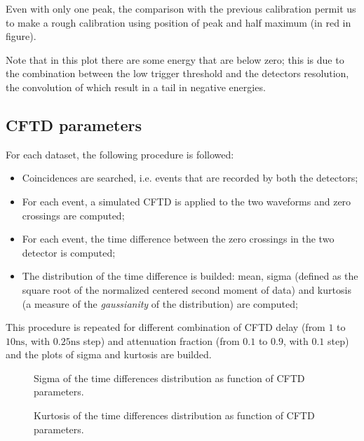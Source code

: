 \documentclass[11pt,a4 paper]{article}
\begin{document}
Even with only one peak, the comparison with the previous calibration permit us to make a rough calibration using position of peak and half maximum (in red in figure).

Note that in this plot there are some energy that are below zero; this is due to the combination between the low trigger threshold and the detectors resolution, the convolution of which result in a tail in negative energies.

\subsection{CFTD parameters}
For each dataset, the following procedure is followed:
\begin{itemize}[noitemsep]
    \item Coincidences are searched, i.e. events that are recorded by both the detectors;
    \item For each event, a simulated CFTD is applied to the two waveforms and zero crossings are computed;
    \item For each event, the time difference between the zero crossings in the two detector is computed;
    \item The distribution of the time difference is builded: mean, sigma (defined as the square root of the normalized centered second moment of data) and kurtosis (a measure of the \emph{gaussianity} of the distribution) are computed;
\end{itemize}
This procedure is repeated for different combination of CFTD delay (from $1$ to $10\si{\nano\second}$, with $0.25\si{\nano\second}$ step) and attenuation fraction (from $0.1$ to $0.9$, with $0.1$ step) and the plots of sigma and kurtosis are builded.

\begin{figure}[H]
    \centering
    \caption{Sigma of the time differences distribution as function of CFTD parameters.}
    \label{fig:sigma2D:sim}
\end{figure}

\begin{figure}[H]
    \centering
    \caption{Kurtosis of the time differences distribution as function of CFTD parameters.}
    \label{fig:kurt:sim}
\end{figure}
\end{document}
